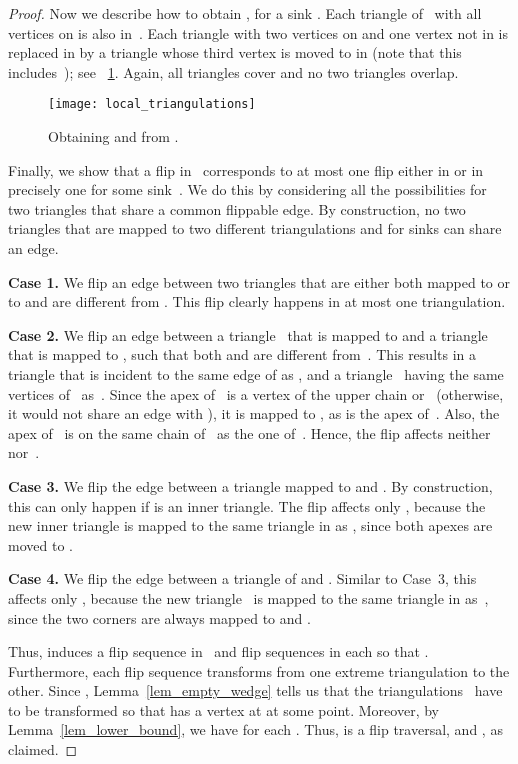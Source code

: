\documentclass[a4paper,11pt]{article}
\newcommand{\qedopt}{}
\begin{document}
\begin{proof}
Now we describe how to obtain , for a sink .
Each triangle of~ with all vertices on  is also in~. 
Each triangle with two vertices on  and one vertex not in 
 is replaced in  by a triangle whose 
third vertex is moved to
 in  (note that this includes~);
see \figurename~\ref{fig_local_triangulations}. Again, all triangles
cover  and no two triangles overlap.

\begin{figure}
\centering
\texttt{[image: local\_triangulations]}
\caption{Obtaining  and  from .}
\label{fig_local_triangulations}
\end{figure}

Finally, we show that a flip in~ corresponds to at most one flip either in  or in precisely one  for some sink~.
We do this by considering all the possibilities for two triangles that share a common flippable edge.
By construction, no two triangles that are mapped to two different triangulations  and  for sinks  can share an edge.

\textbf{Case 1.}  We flip an edge between two triangles that are either both mapped to  or to  and are different from .
This flip clearly happens in at most one triangulation.

\textbf{Case 2.} We flip an edge between a triangle~ that is mapped to  and a triangle~ that is mapped to , such that both  and  are different from~.
This results in a triangle  that is incident to the same edge of  as , and a triangle~ having the same vertices of~
as~.
Since the apex of~ is a vertex of the upper chain or~
(otherwise, it would not share an edge with ), it is
mapped to , as is the apex of~.  Also, the apex of~ is on
the same chain of~ as the one of~.  Hence, the flip affects neither  nor~.

\textbf{Case 3.}
We flip the edge between a triangle  mapped to  and
.
By construction, this can only happen if  is an inner triangle.
The flip affects only , because the new inner triangle
 is mapped to the same triangle in  as , since both
apexes are moved to .

\textbf{Case 4.}
We flip the edge between a
triangle  of  and . Similar to Case~3, this
affects only , because the new
triangle~ is mapped to the same triangle in  as~, 
since the two corners are always
mapped to  and .

Thus,  induces a flip sequence
 in~ and flip sequences  in each 
so that .
Furthermore, each flip sequence  transforms 
from one extreme triangulation to the other.
Since , Lemma~\ref{lem_empty_wedge} tells us that the 
triangulations~ have to be transformed so that  has a vertex at  at some point. Moreover, by Lemma~\ref{lem_lower_bound}, we have
 for each .
Thus,  is a flip traversal,
and , as claimed.
\qedopt
\end{proof}
\end{document}
